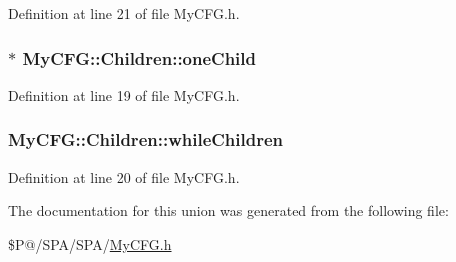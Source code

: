 Definition at line 21 of file My\-C\-F\-G.\-h.

\hypertarget{union_my_c_f_g_1_1_children_a2c3d531a988c448a8d71ae776069fd81}{
\subsubsection[{one\-Child}]{$\ast$ My\-C\-F\-G\-::\-Children\-::one\-Child}}\label{union_my_c_f_g_1_1_children_a2c3d531a988c448a8d71ae776069fd81}


Definition at line 19 of file My\-C\-F\-G.\-h.

\hypertarget{union_my_c_f_g_1_1_children_a45c94090b7b225a2edaf75b2fab4a654}{
\subsubsection[{while\-Children}]{ My\-C\-F\-G\-::\-Children\-::while\-Children}}\label{union_my_c_f_g_1_1_children_a45c94090b7b225a2edaf75b2fab4a654}


Definition at line 20 of file My\-C\-F\-G.\-h.



The documentation for this union was generated from the following file\-:\begin{DoxyCompactItemize}
\item 
\$\-P@/\-S\-P\-A/\-S\-P\-A/\hyperlink{_my_c_f_g_8h}{My\-C\-F\-G.\-h}\end{DoxyCompactItemize}
